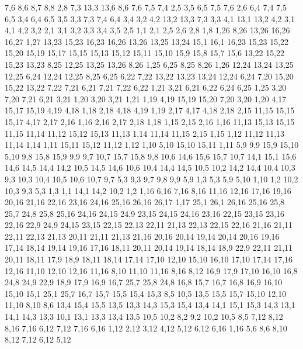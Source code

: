 7,6
8,6
8,7
8,8
2,8
%
7,3
13,3
13,6
8,6
7,6
7,5
7,4
%
2,5
3,5
6,5
7,5
7,6
2,6
%
6,4
7,4
7,5
6,5
%
3,4
6,4
6,5
3,5
%
3,3
7,3
7,4
6,4
3,4
%
3,2
4,2
13,2
13,3
7,3
3,3
%
4,1
13,1
13,2
4,2
%
3,1
4,1
4,2
3,2
%
2,1
3,1
3,2
3,3
3,4
3,5
2,5
%
1,1
2,1
2,5
2,6
2,8
1,8
1,26
8,26
13,26
16,26
16,27
1,27
%
13,23
15,23
16,23
16,26
13,26
13,25
13,24
%
15,1
16,1
16,23
15,23
15,22
15,20
15,19
15,17
15,15
15,13
15,12
15,11
15,10
15,9
15,8
15,7
15,6
%
13,22
15,22
15,23
13,23
%
8,25
12,25
13,25
13,26
8,26
%
1,25
6,25
8,25
8,26
1,26
%
12,24
13,24
13,25
12,25
%
6,24
12,24
12,25
8,25
6,25
%
6,22
7,22
13,22
13,23
13,24
12,24
6,24
%
7,20
15,20
15,22
13,22
7,22
7,21
%
6,21
7,21
7,22
6,22
%
1,21
3,21
6,21
6,22
6,24
6,25
1,25
%
3,20
7,20
7,21
6,21
3,21
%
1,20
3,20
3,21
1,21
%
1,19
4,19
15,19
15,20
7,20
3,20
1,20
%
4,17
15,17
15,19
4,19
4,18
%
1,18
2,18
4,18
4,19
1,19
%
2,17
4,17
4,18
2,18
%
2,15
11,15
15,15
15,17
4,17
2,17
2,16
%
1,16
2,16
2,17
2,18
1,18
%
1,15
2,15
2,16
1,16
%
11,13
15,13
15,15
11,15
11,14
%
11,12
15,12
15,13
11,13
%
1,14
11,14
11,15
2,15
1,15
%
1,12
11,12
11,13
11,14
1,14
%
1,11
15,11
15,12
11,12
1,12
%
1,10
5,10
15,10
15,11
1,11
%
5,9
9,9
15,9
15,10
5,10
%
9,8
15,8
15,9
9,9
%
9,7
10,7
15,7
15,8
9,8
%
10,6
14,6
15,6
15,7
10,7
%
14,1
15,1
15,6
14,6
14,5
14,4
14,2
%
10,5
14,5
14,6
10,6
%
10,4
14,4
14,5
10,5
%
10,2
14,2
14,4
10,4
10,3
%
9,3
10,3
10,4
10,5
10,6
10,7
9,7
%
5,3
9,3
9,7
9,8
9,9
5,9
%
1,3
5,3
5,9
5,10
1,10
%
1,2
10,2
10,3
9,3
5,3
1,3
%
1,1
14,1
14,2
10,2
1,2
1,16
6,16
7,16
8,16
11,16
12,16
17,16
19,16
20,16
21,16
22,16
23,16
24,16
25,16
26,16
26,17
1,17
%
25,1
26,1
26,16
25,16
25,8
25,7
%
24,8
25,8
25,16
24,16
24,15
24,9
%
23,15
24,15
24,16
23,16
%
22,15
23,15
23,16
22,16
%
22,9
24,9
24,15
23,15
22,15
22,13
22,11
%
21,13
22,13
22,15
22,16
21,16
%
21,11
22,11
22,13
21,13
%
20,11
21,11
21,13
21,16
20,16
20,14
%
19,14
20,14
20,16
19,16
%
17,14
18,14
19,14
19,16
17,16
%
18,11
20,11
20,14
19,14
18,14
%
18,9
22,9
22,11
21,11
20,11
18,11
%
17,9
18,9
18,11
18,14
17,14
17,10
%
12,10
15,10
16,10
17,10
17,14
17,16
12,16
%
11,10
12,10
12,16
11,16
%
8,10
11,10
11,16
8,16
8,12
%
16,9
17,9
17,10
16,10
%
16,8
24,8
24,9
22,9
18,9
17,9
16,9
%
16,7
25,7
25,8
24,8
16,8
%
15,7
16,7
16,8
16,9
16,10
15,10
%
15,1
25,1
25,7
16,7
15,7
15,5
15,4
15,3
%
8,5
10,5
13,5
15,5
15,7
15,10
12,10
11,10
8,10
8,6
%
13,4
15,4
15,5
13,5
%
13,3
14,3
15,3
15,4
13,4
%
14,1
15,1
15,3
14,3
%
13,1
14,1
14,3
13,3
%
10,1
13,1
13,3
13,4
13,5
10,5
10,2
%
8,2
9,2
10,2
10,5
8,5
%
7,12
8,12
8,16
7,16
%
6,12
7,12
7,16
6,16
%
1,12
2,12
3,12
4,12
5,12
6,12
6,16
1,16
%
5,6
8,6
8,10
8,12
7,12
6,12
5,12
